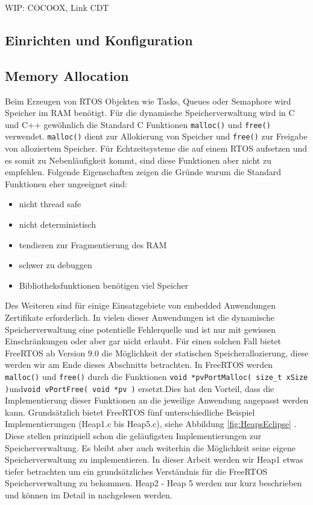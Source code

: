 \documentclass[ngerman]{seminarvorlage}
\begin{document}
WIP: COCOOX, Link CDT       
\subsection{Einrichten und Konfiguration}
\label{sec:Einrichtung und Konfiguration}
\subsection{Memory Allocation}
Beim Erzeugen von RTOS Objekten wie Tasks, Queues oder Semaphore wird Speicher im RAM benötigt. Für die dynamische Speicherverwaltung wird in C und C++ gewöhnlich die Standard C Funktionen \verb|malloc()| und \verb|free()| verwendet. \verb|malloc()| dient zur Allokierung von Speicher und \verb|free()| zur Freigabe von alloziertem Speicher. Für Echtzeitsysteme die auf einem RTOS aufsetzen und es somit zu Nebenläufigkeit kommt, sind diese Funktionen aber nicht zu empfehlen. Folgende Eigenschaften\cite{MasteringFreeRtos} zeigen die Gründe warum die Standard Funktionen eher ungeeignet sind:
\begin{itemize}
	\item nicht thread safe
	\item nicht deterministisch
	\item tendieren zur Fragmentierung des RAM
	\item schwer zu debuggen
	\item Bibliotheksfunktionen benötigen viel Speicher
\end{itemize}
Des Weiteren sind für einige Einsatzgebiete von embedded Anwendungen Zertifikate erforderlich. In vielen dieser Anwendungen ist die dynamische Speicherverwaltung eine potentielle Fehlerquelle und ist nur mit gewissen Einschränkungen oder aber gar nicht erlaubt. Für einen solchen Fall bietet FreeRTOS ab Version 9.0 die Möglichkeit der statischen Speicherallozierung, diese werden wir am Ende dieses Abschnitts betrachten. In FreeRTOS werden  \verb|malloc()| und \verb|free()| durch die Funktionen \newline \verb|void *pvPortMalloc( size_t xSize )|\newline und\newline \verb|void vPortFree( void *pv )| ersetzt.\newline Dies hat den Vorteil, dass die Implementierung dieser Funktionen an die jeweilige Anwendung angepasst werden kann. Grundsätzlich bietet FreeRTOS fünf unterschiedliche Beispiel Implementierungen (Heap1.c bis Heap5.c), siehe Abbildung \ref{fig:HeapsEclipse} . Diese stellen prinzipiell schon die geläufigsten Implementierungen zur Speicherverwaltung. Es bleibt aber auch weiterhin die Möglichkeit seine eigene Speicherverwaltung zu implementieren. In dieser Arbeit werden wir Heap1 etwas tiefer betrachten um ein grundsätzliches Verständnis für die FreeRTOS Speicherverwaltung zu bekommen. Heap2 - Heap 5 werden nur kurz beschrieben und können im Detail in \cite{MasteringFreeRtos}\cite{FreeRtosAdvanced} nachgelesen werden.      
\end{document}

